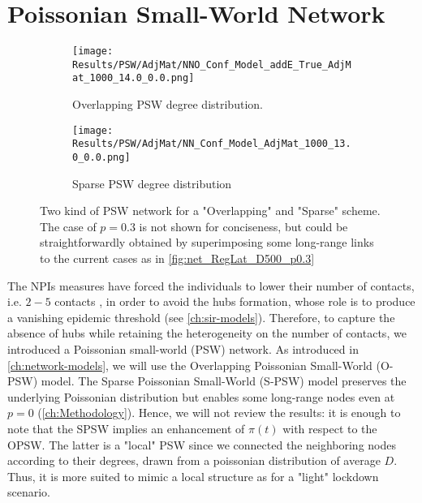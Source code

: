 \documentclass[a4paper,10pt]{book} %
\theoremstyle{definition}
\begin{document}
\section{Poissonian Small-World Network}
\thispagestyle{empty}
\label{sec:res_PSW}
\begin{figure}[ht]
    \begin{subfigure}{.45\linewidth}
        \texttt{[image: Results/PSW/AdjMat/NNO\_Conf\_Model\_addE\_True\_AdjMat\_1000\_14.0\_0.0.png]}
        \centering
        \caption{Overlapping PSW degree distribution. }
        \label{fig:net_O-PSW}
    \end{subfigure}
	\hfill
	\begin{subfigure}{.45\linewidth}
        \texttt{[image: Results/PSW/AdjMat/NN\_Conf\_Model\_AdjMat\_1000\_13.0\_0.0.png]}
        \centering
        \caption{Sparse PSW degree distribution}
        \label{fig:net_S-PSW}
    \end{subfigure}
	\caption{Two kind of PSW network for a "Overlapping" and "Sparse" scheme. The case of $p = 0.3$ is not shown for conciseness, but could be straightforwardly obtained by superimposing some long-range links to the current cases as in \autoref{fig:net_RegLat_D500_p0.3}}
\end{figure}
The NPIs measures have forced the individuals to lower their number of contacts, i.e. $2-5$ contacts \cite{Liu::2021_Review_SContactPattern}, in order to avoid the hubs formation, whose role is to produce a vanishing epidemic threshold (see \autoref{ch:sir-models}).
Therefore, to capture the absence of hubs while retaining the heterogeneity on the number of contacts, we introduced a Poissonian small-world (PSW) network.
As introduced in \autoref{ch:network-models}, we will use the Overlapping Poissonian Small-World (O-PSW) model. The Sparse Poissonian Small-World (S-PSW) model preserves the underlying Poissonian distribution but enables some long-range nodes even at $ p = 0$ (\autoref{ch:Methodology}). Hence, we will not review the results: it is enough to note that the SPSW implies an enhancement of $\pi(t)$ with respect to the OPSW. The latter is a "local" PSW since we connected the neighboring nodes according to their degrees, drawn from a poissonian distribution of average $ D$. Thus, it is more suited to mimic a local structure as for a "light" lockdown scenario.  
\end{document}
